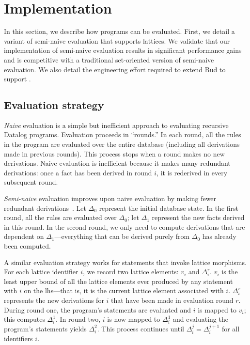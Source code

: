 \section{Implementation}
\label{sec:impl}

In this section, we describe how \lang programs can be evaluated. First, we
detail a variant of semi-naive evaluation that supports lattices. We validate
that our implementation of semi-naive evaluation results in significant
performance gains and is competitive with a traditional set-oriented version of
semi-naive evaluation. We also detail the engineering effort required to extend
Bud to support \lang. %

\subsection{Evaluation strategy}
\label{sec:lattice-eval-strat}
\emph{Naive} evaluation is a simple but inefficient approach to evaluating
recursive Datalog programs. Evaluation proceeds in ``rounds.'' In each round, all
the rules in the program are evaluated over the entire database (including all
derivations made in previous rounds). This process stops when a round makes no
new derivations. Naive evaluation is inefficient because it makes many redundant
derivations: once a fact has been derived in round $i$, it is rederived in every
subsequent round.

\emph{Semi-naive} evaluation improves upon naive evaluation by making fewer
redundant derivations~\cite{Balbin1987}. Let $\Delta_0$ represent the initial
database state. In the first round, all the rules are evaluated over $\Delta_0$;
let $\Delta_1$ represent the new facts derived in this round. In the second
round, we only need to compute derivations that are dependent on
$\Delta_1$---everything that can be derived purely from $\Delta_0$ has already
been computed.

A similar evaluation strategy works for \lang statements that invoke lattice
morphisms. For each lattice identifier $i$, we record two lattice elements:
$v_i$ and $\Delta^r_i$. $v_i$ is the least upper bound of all the lattice
elements ever produced by any statement with $i$ on the lhs---that is, it is the
current lattice element associated with $i$. $\Delta^r_i$ represents the new
derivations for $i$ that have been made in evaluation round $r$. During round
one, the program's statements are evaluated and $i$ is mapped to $v_i$; this
computes $\Delta^1_i$. In round two, $i$ is now mapped to $\Delta^1_i$ and
evaluating the program's statements yields $\Delta^2_i$. This process continues
until $\Delta^j_i = \Delta^{j+1}_i$ for all identifiers $i$.

